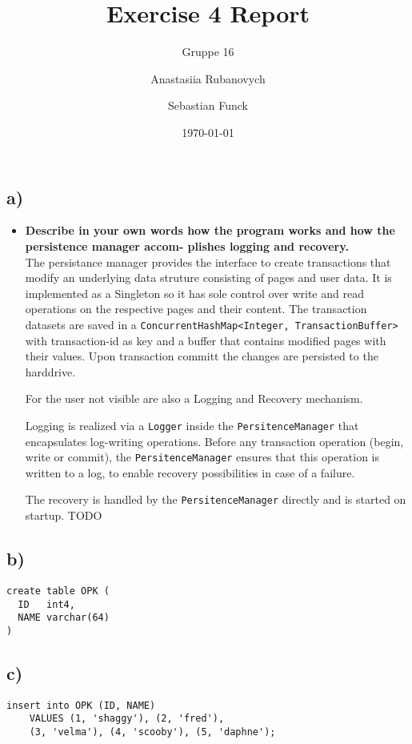 \documentclass[a4paper,english,abstract=on]{scrartcl}
\title{Exercise 4 Report}
\subtitle{Gruppe 16}
\author{Anastasiia Rubanovych\and Sebastian Funck}
\date{\today}
\begin{document}
\maketitle

\subsection*{a)}
\begin{itemize}
	\item \textbf{Describe in your own words how the program works and how the persistence manager accom-
		plishes logging and recovery.}\\
	
	The persistance manager provides the interface to create transactions that modify an underlying data struture consisting of pages and user data. It is implemented as a Singleton so it has sole control over write and read operations on the respective pages and their content. The transaction datasets are saved in a \texttt{ConcurrentHashMap<Integer, TransactionBuffer>} with transaction-id as key and a buffer that contains modified pages with their values. Upon transaction committ the changes are persisted to the harddrive.
	
	
	 For the user not visible are also a Logging and Recovery mechanism. 
	
	Logging is realized via a \texttt{Logger} inside the \texttt{PersitenceManager} that encapsulates log-writing operations. Before any transaction operation (begin, write or commit), the \texttt{PersitenceManager} ensures that this operation is written to a log, to enable recovery possibilities in case of a failure.
	
	The recovery is handled by the  \texttt{PersitenceManager} directly and is started on startup. TODO
\end{itemize}

\subsection*{b)}
\begin{lstlisting}
create table OPK (
  ID   int4,
  NAME varchar(64)
)
\end{lstlisting}

\subsection*{c)}
\begin{lstlisting}
insert into OPK (ID, NAME) 	
    VALUES (1, 'shaggy'), (2, 'fred'),
    (3, 'velma'), (4, 'scooby'), (5, 'daphne');
\end{lstlisting}
\end{document}
